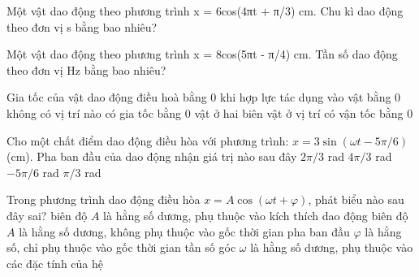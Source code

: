 \begin{ex}
Một vật dao động theo phương trình x = 6cos(4πt + π/3) cm. Chu kì dao động theo đơn vị s bằng bao nhiêu?
\end{ex}

\begin{ex}
Một vật dao động theo phương trình x = 8cos(5πt - π/4) cm. Tần số dao động theo đơn vị Hz bằng bao nhiêu?
\end{ex}

\begin{ex}
Gia tốc của vật dao động điều hoà bằng 0 khi
\choice
{\True hợp lực tác dụng vào vật bằng 0}
{không có vị trí nào có gia tốc bằng 0}
{vật ở hai biên}
{vật ở vị trí có vận tốc bằng 0}
\end{ex}

\begin{ex}
Cho một chất điểm dao động điều hòa với phương trình: $x=3\sin(\omega t-5\pi/6)$ (cm). Pha ban đầu của dao động nhận giá trị nào sau đây
\choice
{\True $2\pi/3$ rad}
{$4\pi/3$ rad}
{$-5\pi/6$ rad}
{$\pi/3$ rad}
\end{ex}

\begin{ex}
Trong phương trình dao động điều hòa $x = A\cos(\omega t + \varphi)$, phát biểu nào sau đây sai?
\choice
{biên độ $A$ là hằng số dương, phụ thuộc vào kích thích dao động}
{biên độ $A$ là hằng số dương, không phụ thuộc vào gốc thời gian}
{\True pha ban đầu $\varphi$ là hằng số, chỉ phụ thuộc vào gốc thời gian}
{tần số góc $\omega$ là hằng số dương, phụ thuộc vào các đặc tính của hệ}
\end{ex}

